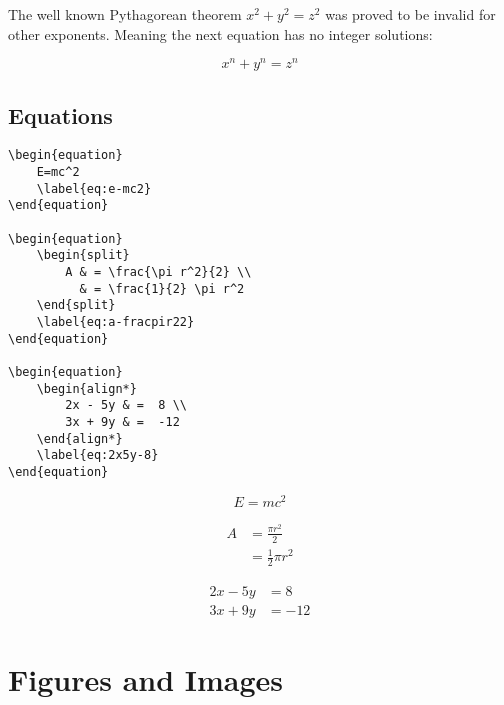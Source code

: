 The well known Pythagorean theorem \(x^2 + y^2 = z^2\) was
proved to be invalid for other exponents.
Meaning the next equation has no integer solutions:

\[x^n + y^n = z^n\]

\subsection*{Equations}

\begin{lstlisting}[caption={Equations.}]
\begin{equation}
    E=mc^2
    \label{eq:e-mc2}
\end{equation}

\begin{equation}
    \begin{split}
        A & = \frac{\pi r^2}{2} \\
          & = \frac{1}{2} \pi r^2
    \end{split}
    \label{eq:a-fracpir22}
\end{equation}

\begin{equation}
    \begin{align*}
        2x - 5y & =  8 \\
        3x + 9y & =  -12
    \end{align*}
    \label{eq:2x5y-8}
\end{equation}
\end{lstlisting}

\begin{equation}
    E=mc^2
    \label{eq:e-mc2}
\end{equation}

\begin{equation}
    \begin{split}
        A & = \frac{\pi r^2}{2} \\
          & = \frac{1}{2} \pi r^2
    \end{split}
    \label{eq:a-fracpir22}
\end{equation}

\begin{equation}
    \begin{align*}
        2x - 5y & =  8 \\
        3x + 9y & =  -12
    \end{align*}
    \label{eq:2x5y-8}
\end{equation}

\section*{Figures and Images}

